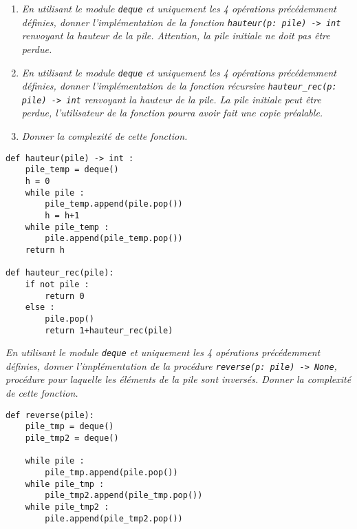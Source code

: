 \begin{exemple}
\begin{enumerate}
\item \textit{En utilisant le module \texttt{deque} et uniquement les 4 opérations précédemment définies, donner l'implémentation de la fonction \texttt{hauteur(p: pile) -> int} renvoyant la hauteur de la pile. Attention, la pile initiale ne doit pas être perdue.}

\item \textit{En utilisant le module \texttt{deque} et uniquement les 4 opérations précédemment définies, donner l'implémentation de la fonction récursive \texttt{hauteur\_rec(p: pile) -> int} renvoyant la hauteur de la pile. La pile initiale peut être perdue, l'utilisateur de la fonction pourra avoir fait  une copie préalable.}

\item \textit{Donner la complexité de cette fonction.}
\end{enumerate}
\ifprof
\begin{lstlisting}
def hauteur(pile) -> int : 
    pile_temp = deque()
    h = 0
    while pile : 
        pile_temp.append(pile.pop())
        h = h+1
    while pile_temp : 
        pile.append(pile_temp.pop())
    return h
    
def hauteur_rec(pile):
    if not pile : 
        return 0
    else :
        pile.pop()
        return 1+hauteur_rec(pile)
\end{lstlisting}
\else
\vspace{10cm}
\fi

\end{exemple}



\begin{exemple}
\textit{En utilisant le module \texttt{deque} et uniquement les 4 opérations précédemment définies, donner l'implémentation de la procédure \texttt{reverse(p: pile) -> None}, procédure pour laquelle les éléments de la pile sont inversés. Donner la complexité de cette fonction.}

\begin{lstlisting}
def reverse(pile):
    pile_tmp = deque()
    pile_tmp2 = deque()

    while pile : 
        pile_tmp.append(pile.pop())
    while pile_tmp : 
        pile_tmp2.append(pile_tmp.pop())
    while pile_tmp2 : 
        pile.append(pile_tmp2.pop())
\end{lstlisting}

\end{exemple}


